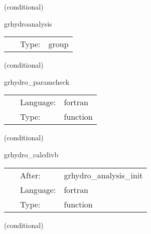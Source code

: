\documentclass{article}
\begin{document}
\vspace{5mm}

   (conditional) 

\hspace{5mm} grhydroanalysis 

\hspace{5mm}{\it calculate analysis quantities } 


\hspace{5mm}

 \begin{tabular*}{160mm}{cll} 
~ & Type:  & group \\ 
\end{tabular*} 


\vspace{5mm}

   (conditional) 

\hspace{5mm} grhydro\_paramcheck 

\hspace{5mm}{\it check parameters } 


\hspace{5mm}

 \begin{tabular*}{160mm}{cll} 
~ & Language:  & fortran \\ 
~ & Type:  & function \\ 
\end{tabular*} 


\vspace{5mm}

   (conditional) 

\hspace{5mm} grhydro\_calcdivb 

\hspace{5mm}{\it calculate divb } 


\hspace{5mm}

 \begin{tabular*}{160mm}{cll} 
~ & After:  & grhydro\_analysis\_init \\ 
~ & Language:  & fortran \\ 
~ & Type:  & function \\ 
\end{tabular*} 


\vspace{5mm}

   (conditional) 
\end{document}
